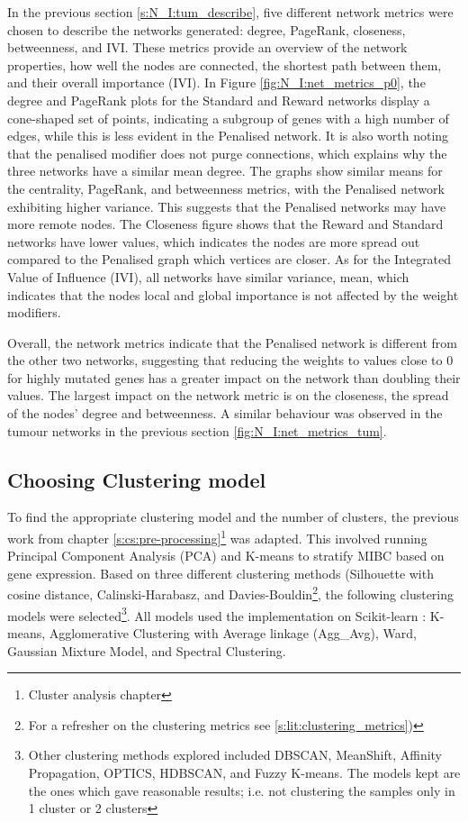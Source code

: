 In the previous section \ref{s:N_I:tum_describe}, five different network metrics were chosen to describe the networks generated: degree, PageRank, closeness, betweenness, and IVI. These metrics provide an overview of the network properties, how well the nodes are connected, the shortest path between them, and their overall importance (IVI). In Figure \ref{fig:N_I:net_metrics_p0}, the degree and PageRank plots for the Standard and Reward networks display a cone-shaped set of points, indicating a subgroup of genes with a high number of edges, while this is less evident in the Penalised network. It is also worth noting that the penalised modifier does not purge connections, which explains why the three networks have a similar mean degree. The graphs show similar means for the centrality, PageRank, and betweenness metrics, with the Penalised network exhibiting higher variance. This suggests that the Penalised networks may have more remote nodes. The Closeness figure shows that the Reward and Standard networks have lower values, which indicates the nodes are more spread out compared to the Penalised graph which vertices are closer. As for the Integrated Value of Influence (IVI), all networks have similar variance, mean, which indicates that the nodes local and global importance is not affected by the weight modifiers.

Overall, the network metrics indicate that the Penalised network is different from the other two networks, suggesting that reducing the weights to values close to 0 for highly mutated genes has a greater impact on the network than doubling their values. The largest impact on the network metric is on the closeness, the spread of the nodes' degree and betweenness. A similar behaviour was observed in the tumour networks in the previous section \cref{fig:N_I:net_metrics_tum}.

\subsection{Choosing Clustering model} \label{s:p0:clustering_analysis}

To find the appropriate clustering model and the number of clusters, the previous work from chapter \cref{s:cs:pre-processing}\footnote{Cluster analysis chapter} was adapted. This involved running Principal Component Analysis (PCA) and K-means to stratify MIBC based on gene expression. Based on three different clustering methods (Silhouette with cosine distance, Calinski-Harabasz, and Davies-Bouldin\footnote{For a refresher on the clustering metrics see \cref{s:lit:clustering_metrics})}, the following clustering models were selected\footnote{Other clustering methods explored included DBSCAN, MeanShift, Affinity Propagation, OPTICS, HDBSCAN, and Fuzzy K-means. The models kept are the ones which gave reasonable results; i.e. not clustering the samples only in 1 cluster or 2 clusters}. All models used the implementation on Scikit-learn \cite{Scikit-learn_undated-ax}: K-means, Agglomerative Clustering with Average linkage (Agg\_Avg), Ward, Gaussian Mixture Model, and Spectral Clustering.

